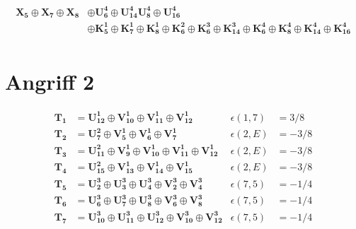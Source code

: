 \begin{equation*}
\begin{aligned}
    \mathbf{X_5} \oplus{} \mathbf{X_7} \oplus{} \mathbf{X_8} &\oplus{} \mathbf{U^4_6} \oplus{} \mathbf{U^4_{14}} \mathbf{U^4_8} \oplus{} \mathbf{U^4_{16}} \\
    &\oplus{} \mathbf{K^1_5} \oplus{} \mathbf{K^1_7} \oplus{} \mathbf{K^1_8} \oplus{} \mathbf{K^2_6} \oplus{} \mathbf{K^3_6} \oplus{} \mathbf{K^3_{14}} \oplus{} \mathbf{K^4_6} \oplus{} \mathbf{K^4_8} \oplus{} \mathbf{K^4_{14}}  \oplus{} \mathbf{K^4_{16}} \\
\end{aligned}
\end{equation*}

\section*{Angriff 2}

\begin{equation*}
\begin{aligned}
    \mathbf{T_1} &= \mathbf{U^1_{12}} \oplus{} \mathbf{V^1_{10}} \oplus{} \mathbf{V^1_{11}} \oplus{} \mathbf{V^1_{12}}                          
    & \epsilon(1,7) &= 3/8 \\
    \mathbf{T_2} &= \mathbf{U^2_7} \oplus{} \mathbf{V^1_5} \oplus{} \mathbf{V^1_6} \oplus{} \mathbf{V^1_7} 
    & \epsilon(2,E) &= -3/8 \\
    \mathbf{T_3} &= \mathbf{U^2_{11}} \oplus{} \mathbf{V^1_9} \oplus{} \mathbf{V^1_{10}} \oplus{} \mathbf{V^1_{11}} \oplus{} \mathbf{V^1_{12}} 
    & \epsilon(2,E) &= -3/8 \\
    \mathbf{T_4} &= \mathbf{U^2_{15}} \oplus{} \mathbf{V^1_{13}} \oplus{} \mathbf{V^1_{14}} \oplus{} \mathbf{V^1_{15}} 
    & \epsilon(2,E) &= -3/8 \\
    \mathbf{T_5} &= \mathbf{U^3_2} \oplus{} \mathbf{U^3_3} \oplus{} \mathbf{U^3_4} \oplus{} \mathbf{V^3_2} \oplus{} \mathbf{V^3_4}
    & \epsilon(7,5) &= -1/4 \\
    \mathbf{T_6} &= \mathbf{U^3_6} \oplus{} \mathbf{U^3_7} \oplus{} \mathbf{U^3_8} \oplus{} \mathbf{V^3_6} \oplus{} \mathbf{V^3_8}       
    & \epsilon(7,5) &= -1/4 \\
    \mathbf{T_7} &= \mathbf{U^3_{10}} \oplus{} \mathbf{U^3_{11}} \oplus{} \mathbf{U^3_{12}} \oplus{} \mathbf{V^3_{10}} \oplus{} \mathbf{V^3_{12}}
    & \epsilon(7,5) &= -1/4 \\
\end{aligned}
\end{equation*}


